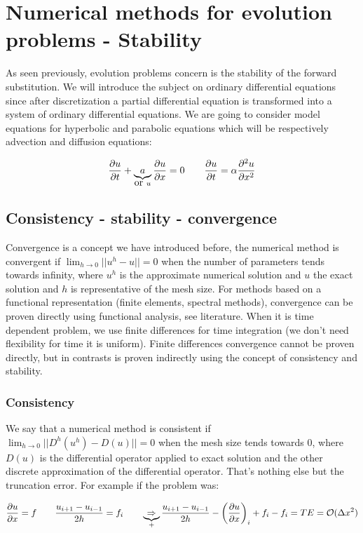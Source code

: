 \chapter{Numerical methods for evolution problems - Stability}
As seen previously, evolution problems concern is the stability of the forward substitution. We will introduce the subject on ordinary differential equations since after discretization a partial differential equation is transformed into a system of ordinary differential equations. We are going to consider model equations for hyperbolic and parabolic equations which will be respectively advection and diffusion equations: 

\begin{equation}
\frac{\partial u}{\partial t} + \underbrace{a}_{\mbox{or } u} \frac{\partial u}{\partial x} = 0 \qquad \frac{\partial u }{\partial t} = \alpha \frac{\partial ^2u}{\partial x^2}
\end{equation}

\section{Consistency - stability - convergence}
Convergence is a concept we have introduced before, the numerical method is convergent if $\lim _{h\rightarrow 0} || u^h - u|| = 0$ when the number of parameters tends towards infinity, where $u^h$ is the approximate numerical solution and $u$ the exact solution and $h$ is representative of the mesh size. For methods based on a functional representation (finite elements, spectral methods), convergence can be proven directly using functional analysis, see literature. When it is time dependent problem, we use finite differences for time integration (we don't need flexibility for time it is uniform). Finite differences convergence cannot be proven directly, but in contrasts is proven indirectly using the concept of consistency and stability. 

\subsection{Consistency}
We say that a numerical method is consistent if $\lim _{h\rightarrow 0} ||D^h(u^h) - D(u)||=0$ when the mesh size tends towards 0, where $D(u)$ is the differential operator applied to exact solution and the other discrete approximation of the differential operator. That's nothing else but the truncation error.  For example if the problem was: 

\begin{equation}
\frac{\partial u}{\partial x} = f \qquad \frac{u_{i+1}-u_{i-1}}{2h} = f_i \qquad
 \underbrace{\Rightarrow}_{+} \frac{u_{i+1}-u_{i-1}}{2h} - \left( \frac{\partial u}{\partial x}\right) _i + f_i - f_i = TE = \mathcal{O}(\Delta x^2)
\end{equation}

